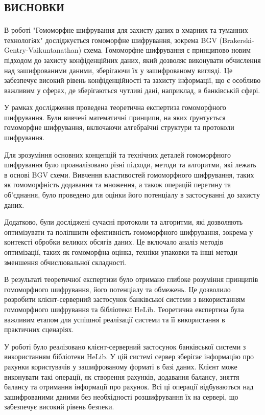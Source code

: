 \newpage
\chapter*{\textsc{висновки}}
В роботі "Гомоморфне шифрування для захисту даних в хмарних та туманних технологiях" досліджується гомоморфне шифрування, зокрема BGV (Brakerski-Gentry-Vaikuntanathan) схема. Гомоморфне шифрування є принципово новим підходом до захисту конфіденційних даних, який дозволяє виконувати обчислення над зашифрованими даними, зберігаючи їх у зашифрованому вигляді. Це забезпечує високий рівень конфіденційності та захисту інформації, що є особливо важливим у сферах, де зберігаються чутливі дані, наприклад, в банківській сфері.

У рамках дослідження проведена теоретична експертиза гомоморфного шифрування. Були вивчені математичні принципи, на яких ґрунтується гомоморфне шифрування, включаючи алгебраїчні структури та протоколи шифрування.

Для зрозуміння основних концепцій та технічних деталей гомоморфного шифрування було проаналізовано різні підходи, методи та алгоритми, які лежать в основі BGV схеми. Вивчення властивостей гомоморфного шифрування, таких як гомоморфність додавання та множення, а також операцій перетину та об'єднання, було проведено для оцінки його потенціалу в застосуванні до захисту даних.

Додатково, були досліджені сучасні протоколи та алгоритми, які дозволяють оптимізувати та поліпшити ефективність гомоморфного шифрування, зокрема у контексті обробки великих обсягів даних. Це включало аналіз методів оптимізації, таких як гомоморфна оцінка, техніки упаковки та інші методи зменшення обчислювальної складності.

В результаті теоретичної експертизи було отримано глибоке розуміння принципів гомоморфного шифрування, його потенціалу та обмежень. Це дозволило розробити клієнт-серверний застосунок банківської системи з використанням гомоморфного шифрування та бібліотеки HeLib. Теоретична експертиза була важливим етапом для успішної реалізації системи та її використання в практичних сценаріях.


У роботі було реалізовано клієнт-серверний застосунок банківської системи з використанням бібліотеки HeLib. У цій системі сервер зберігає інформацію про рахунки користувачів у зашифрованому форматі в базі даних. Клієнт може виконувати такі операції, як створення рахунків, додавання балансу, зняття балансу та отримання інформації про рахунок. Всі ці операції відбуваються над зашифрованими даними без необхідності розшифрування їх на сервері, що забезпечує високий рівень безпеки.

